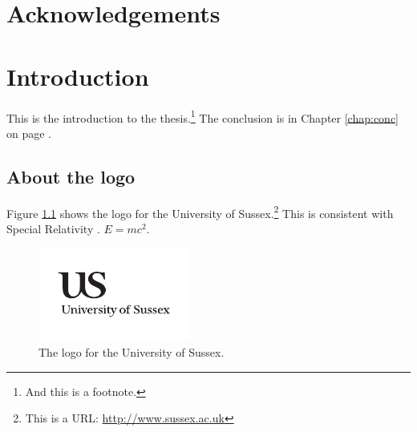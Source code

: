 \documentclass[a4paper,11pt]{report}
\newcommand{\linespacing}{1.5}
\renewcommand{\baselinestretch}{\linespacing}
\begin{document}


\chapter*{Acknowledgements}
\renewcommand{\baselinestretch}{\linespacing}
\small\normalsize



\newpage
{}
\tableofcontents
\listoftables
{}
{}
\listoffigures
{}
{}


\newpage
{}




% 

\chapter{Introduction}
\label{chap:intro}

This is the introduction to the thesis.\footnote{And this is a footnote.}  The conclusion is in Chapter \ref{chap:conc} on page \pageref{chap:conc}.

\section{About the logo}

Figure \ref{us_figure} shows the logo for the University of Sussex.\footnote{This is a URL: \url{http://www.sussex.ac.uk}} This is consistent with Special Relativity \citep{Einstein1905}. $E=mc^2$.

\begin{figure}
\centering
\includegraphics[width=5cm]{uslogo}
\caption[US Logo (optional short caption)]{\label{us_figure} The logo for the University of Sussex.}
\end{figure}
\end{document}
